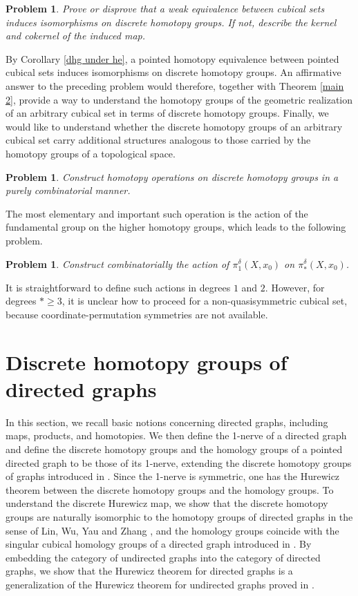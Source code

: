 \documentclass[oneside, 12pt]{amsart}
\numberwithin{equation}{section}
\theoremstyle{plain}
\newtheorem{problem}[theorem]{Problem}
\theoremstyle{definition}
\theoremstyle{remark}
\begin{document}
	\begin{problem}
		Prove or disprove that a weak equivalence between cubical sets induces isomorphisms on discrete homotopy groups. If not, describe the kernel and cokernel of the induced map.
	\end{problem}
	
	By Corollary \ref{dhg under he}, a pointed homotopy equivalence between pointed cubical sets induces isomorphisms on discrete homotopy groups. An affirmative answer to the preceding problem would therefore, together with Theorem \ref{main 2}, provide a way to understand the homotopy groups of the geometric realization of an arbitrary cubical set in terms of discrete homotopy groups. Finally, we would like to understand whether the discrete homotopy groups of an arbitrary cubical set carry additional structures analogous to those carried by the homotopy groups of a topological space.
	
	\begin{problem}
		Construct homotopy operations on discrete homotopy groups in a purely combinatorial manner.
	\end{problem}
	
	The most elementary and important such operation is the action of the fundamental group on the higher homotopy groups, which leads to the following problem.
	
	\begin{problem}
		Construct combinatorially the action of \(\pi_1^\delta(X,x_0)\) on \(\pi_*^\delta(X,x_0)\).
	\end{problem}
	
	It is straightforward to define such actions in degrees \(1\) and \(2\). However, for degrees \(*\ge 3\), it is unclear how to proceed for a non-quasisymmetric cubical set, because coordinate-permutation symmetries are not available.
	
	\section{Discrete homotopy groups of directed graphs}\label{Discrete homotopy groups of directed graphs}
	
	In this section, we recall basic notions concerning directed graphs, including maps, products, and homotopies. We then define the 1-nerve of a directed graph and define the discrete homotopy groups and the homology groups of a pointed directed graph to be those of its 1-nerve, extending the discrete homotopy groups of graphs introduced in \cite{BBdLL,BKLW}. Since the 1-nerve is symmetric, one has the Hurewicz theorem between the discrete homotopy groups and the homology groups. To understand the discrete Hurewicz map, we show that the discrete homotopy groups are naturally isomorphic to the homotopy groups of directed graphs in the sense of Lin, Wu, Yau and Zhang \cite{LWYZ}, and the homology groups coincide with the singular cubical homology groups of a directed graph introduced in \cite{GM2}. By embedding the category of undirected graphs into the category of directed graphs, we show that the Hurewicz theorem for directed graphs is a generalization of the Hurewicz theorem for undirected graphs proved in \cite{CK2}.
	
\end{document}
